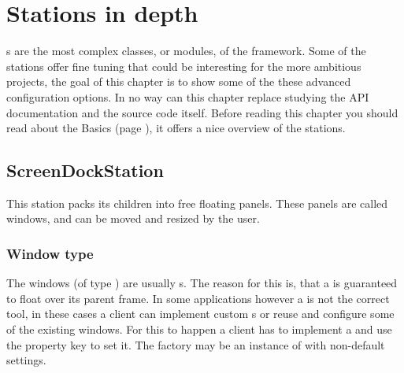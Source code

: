 \section{Stations in depth} \label{sec:stations}
s are the most complex classes, or modules, of the framework. Some of the stations offer fine tuning that could be interesting for the more ambitious projects, the goal of this chapter is to show some of the these advanced configuration options. In no way can this chapter replace studying the API documentation and the source code itself. Before reading this chapter you should read about the Basics (page \pageref{sec:basics}), it offers a nice overview of the stations.

\subsection{ScreenDockStation}
This station packs its children into free floating panels. These panels are called windows, and can be moved and resized by the user.

\subsubsection{Window type}
The windows (of type ) are usually s. The reason for this is, that a  is guaranteed to float over its parent frame.
In some applications however a  is not the correct tool, in these cases a client can implement custom s or reuse and configure some of the existing windows. For this to happen a client has to implement a  and use the property key \linebreak {} to set it. The factory may be an instance of  with non-default settings.


